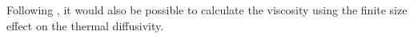 Following \cite{Yeh2004}, it would also be possible to calculate the viscosity using the finite size effect on the thermal diffusivity.




\begin{comment}
\subsection{SETTLE}
The basic idea of the SETTLE algorithm is to use the positions on a triangle before, $\Delta A_0 B_0 C_0$, and after, $\Delta A_1 B_1 C_1$, an unconstrained integration step to determine rotation operations to perform on $\Delta A_0 B_0 C_0$ to achieve a triangle $\Delta A_3 B_3 C_3$ corresponding to a constrained integration step. When we know the rotation operations, we also know the positions $(A_3, B_3, C_3)$ which are what we want for an implementation of the algorithm.

Let us look at the water molecule as a triangle placed in the $X'Y'$ plane of an orthogonal coordinate system $X'Y'Z'$	with the center of mass in the origin, and the oxygen atom placed on the positive y-axis. We denote the triangle $\Delta abc$ beginning with $a$ being the position of oxygen, and $b$ and $c$ the hydrogen positions in the positive direction of rotation around the origin.  In this coordinate system, the triangle is uniquely defined by three numbers: $(r_a, r_b, r_c)$ being the position components $a_y$, $-b_y$ and $c_x$. Triangles denoted by lowercase letters are the canonical water molecule, or the equilibrium configuration. $\Delta ABC$ is a triangle with possibly any positions of the corners, on which we want to perform the contrain operation to get back to the canonical triangle. 

The main derivation of the settle algorithm involve four planes, $\pi_0, \pi_A, \pi_B, \pi_C$ and the assumption that displacement vector for each apex from the unconstrained to the constrained triangle should be parallell to the plane $\pi_0$ of the triangle before the integration step. 

The actual steps to perform in the SETTLE algorithm are (in primed coordinates):
\paragraph{Positions}
\begin{enumerate}
\item Calculate $\phi$ and $\psi$: \\
$\phi$ and $\psi$ can be calculated without any knowledge of forces.
\begin{equation}
\sin\phi = \frac{Z_{A_1}'}{r_a}
\end{equation}
\begin{equation}
\sin\psi = \frac{Z_{B_1}' - Z_{C_1}'}{2r_c\cos\phi}
\end{equation}


\end{comment}
